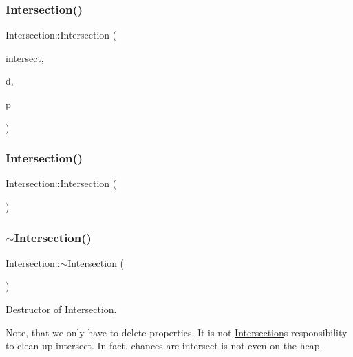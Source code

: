 \subsubsection{\texorpdfstring{Intersection()}{Intersection()}\hspace{0.1cm}{\footnotesize\ttfamily [3/4]}}
{\footnotesize\ttfamily Intersection\+::\+Intersection (\begin{DoxyParamCaption}\item[{const \mbox{\hyperlink{classRenderObject}{Render\+Object}} $\ast$}]{intersect,  }\item[{const double \&}]{d,  }\item[{const \mbox{\hyperlink{classIntersectionProperties}{Intersection\+Properties}} \&}]{p }\end{DoxyParamCaption})}

\mbox{\label{classIntersection_a67497e3efe2793b23909052eeb82c4f3}} 
\subsubsection{\texorpdfstring{Intersection()}{Intersection()}\hspace{0.1cm}{\footnotesize\ttfamily [4/4]}}
{\footnotesize\ttfamily Intersection\+::\+Intersection (\begin{DoxyParamCaption}{ }\end{DoxyParamCaption})}

\mbox{\label{classIntersection_a064951a970ed8dd11081b2903ab62122}} 
\subsubsection{\texorpdfstring{$\sim$Intersection()}{~Intersection()}}
{\footnotesize\ttfamily Intersection\+::$\sim$\+Intersection (\begin{DoxyParamCaption}{ }\end{DoxyParamCaption})}



Destructor of \mbox{\hyperlink{classIntersection}{Intersection}}. 

Note, that we only have to delete properties. It is not \mbox{\hyperlink{classIntersection}{Intersection}}\textquotesingle{}s responsibility to clean up intersect. In fact, chances are intersect is not even on the heap. 

